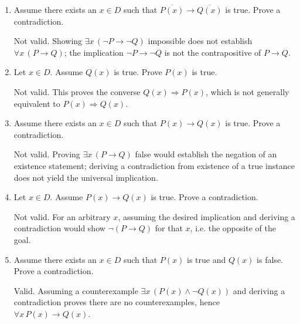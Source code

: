\begin{enumerate}
\begin{enumerate}[label=\Alph*.]
    \item Assume there exists an $x \in D$ such that $\overline{P(x)} \rightarrow \overline{Q(x)}$ is true. Prove a contradiction.\\
    \begin{subanswer}
        Not valid. Showing $\exists x\,(\lnot P\rightarrow\lnot Q)$ impossible does not establish $\forall x\,(P\rightarrow Q)$; the implication $\lnot P\rightarrow\lnot Q$ is not the contrapositive of $P\rightarrow Q$.
    \end{subanswer}

    \item Let $x \in D$. Assume $Q(x)$ is true. Prove $P(x)$ is true.\\
    \begin{subanswer}
        Not valid. This proves the converse $Q(x)\Rightarrow P(x)$, which is not generally equivalent to $P(x)\Rightarrow Q(x)$.
    \end{subanswer}

    \item Assume there exists an $x \in D$ such that $P(x) \rightarrow Q(x)$ is true. Prove a contradiction.\\
    \begin{subanswer}
        Not valid. Proving $\exists x\,(P\rightarrow Q)$ false would establish the negation of an existence statement; deriving a contradiction from existence of a true instance does not yield the universal implication.
    \end{subanswer}

    \item Let $x \in D$. Assume $P(x) \rightarrow Q(x)$ is true. Prove a contradiction.\\
    \begin{subanswer}
        Not valid. For an arbitrary $x$, assuming the desired implication and deriving a contradiction would show $\lnot(P\rightarrow Q)$ for that $x$, i.e. the opposite of the goal.
    \end{subanswer}

    \item Assume there exists an $x \in D$ such that $P(x)$ is true and $Q(x)$ is false. Prove a contradiction.\\
    \begin{subanswer}
        Valid. Assuming a counterexample $\exists x\,(P(x)\land\lnot Q(x))$ and deriving a contradiction proves there are no counterexamples, hence $\forall x\,P(x)\rightarrow Q(x)$.
    \end{subanswer}


\end{enumerate}
\end{enumerate}
